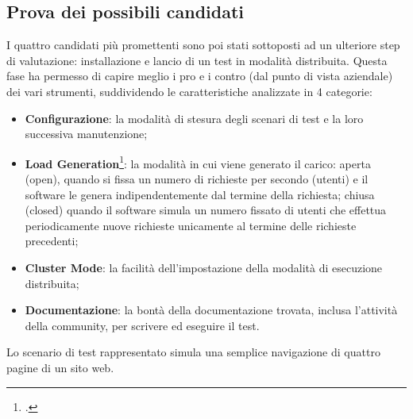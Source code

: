 \subsection{Prova dei possibili candidati}
I quattro candidati più promettenti sono poi stati sottoposti ad un ulteriore step di valutazione: installazione e lancio di un test in modalità distribuita. Questa fase ha permesso di capire meglio i pro e i contro (dal punto di vista aziendale) dei vari strumenti, suddividendo le caratteristiche analizzate in 4 categorie:
\begin{itemize}
	\item \textbf{Configurazione}: la modalità di stesura degli scenari di test e la loro successiva manutenzione;
	\item \textbf{Load Generation}\footcite{article:open-closed}: la modalità in cui viene generato il carico: aperta (open), quando si fissa un numero di richieste per secondo (utenti) e il software le genera indipendentemente dal termine della richiesta; chiusa (closed) quando il software simula un numero fissato di utenti che effettua periodicamente nuove richieste unicamente al termine delle richieste precedenti;
	\item \textbf{Cluster Mode}: la facilità dell'impostazione della modalità di esecuzione distribuita;
	\item \textbf{Documentazione}: la bontà della documentazione trovata, inclusa l'attività della community, per scrivere ed eseguire il test.
\end{itemize}
Lo scenario di test rappresentato simula una semplice navigazione di quattro pagine di un sito web.\\
\newpage
\begingroup
\let\clearpage\relax
\let\cleardoublepage\relax
\let\cleardoublepage\relax
